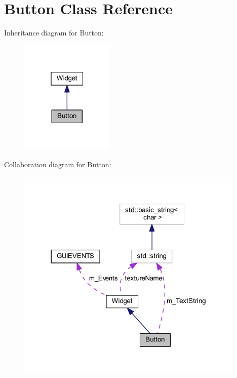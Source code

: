 \hypertarget{class_button}{}\section{Button Class Reference}
\label{class_button}


Inheritance diagram for Button\+:
\nopagebreak
\begin{figure}[H]
\begin{center}
\leavevmode
\includegraphics[width=127pt]{class_button__inherit__graph}
\end{center}
\end{figure}


Collaboration diagram for Button\+:
\nopagebreak
\begin{figure}[H]
\begin{center}
\leavevmode
\includegraphics[width=309pt]{class_button__coll__graph}
\end{center}
\end{figure}
